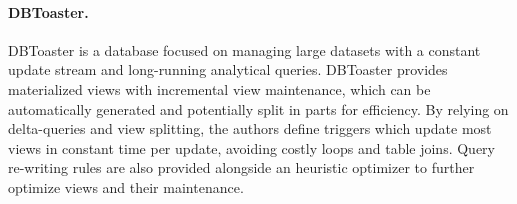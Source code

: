 %


\paragraph{DBToaster.} DBToaster \cite{dbtoaster} is a database focused on managing large datasets with a constant update stream and long-running analytical queries.
DBToaster provides materialized views with incremental view maintenance, which can be automatically generated and potentially split in parts for efficiency.
By relying on delta-queries and view splitting, the authors define triggers which update most views in constant time per update, avoiding costly loops and table joins.
Query re-writing rules are also provided alongside an heuristic optimizer to further optimize views and their maintenance.

